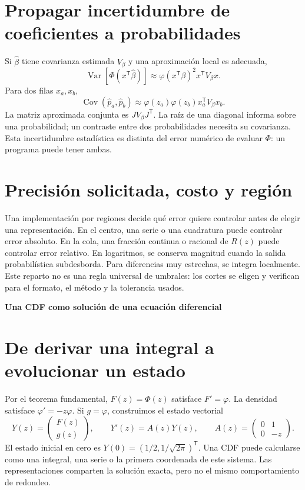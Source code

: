 \documentclass[11pt,a4paper]{article}
\newcommand{\T}{^{\mathsf T}}
\DeclareMathOperator{\Var}{Var}
\DeclareMathOperator{\Cov}{Cov}
\theoremstyle{definition}
\newcommand{\parte}[1]{\par\bigskip\Needspace{8\baselineskip}\begin{center}{\Large\bfseries\color{azul}#1}\end{center}}
\begin{document}
\section{Propagar incertidumbre de coeficientes a probabilidades}
Si $\widehat\beta$ tiene covarianza estimada $V_\beta$ y una aproximación local es adecuada,
\[
\Var[\Phi(x\T\widehat\beta)]
\approx\varphi(x\T\beta)^2x\T V_\beta x.
\]
Para dos filas $x_a,x_b$,
\[
\Cov(\widehat p_a,\widehat p_b)
\approx\varphi(z_a)\varphi(z_b)x_a\T V_\beta x_b.
\]
La matriz aproximada conjunta es $JV_\beta J\T$.
La raíz de una diagonal informa sobre una probabilidad; un contraste entre dos probabilidades necesita su covarianza.
Esta incertidumbre estadística es distinta del error numérico de evaluar $\Phi$: un programa puede tener ambas.

\section{Precisión solicitada, costo y región}
Una implementación por regiones decide qué error quiere controlar antes de elegir una representación.
En el centro, una serie o una cuadratura puede controlar error absoluto.
En la cola, una fracción continua o racional de $R(z)$ puede controlar error relativo.
En logaritmos, se conserva magnitud cuando la salida probabilística subdesborda.
Para diferencias muy estrechas, se integra localmente.
Este reparto no es una regla universal de umbrales: los cortes se eligen y verifican para el formato, el método y la tolerancia usados.



\parte{Una CDF como solución de una ecuación diferencial}
\section{De derivar una integral a evolucionar un estado}
Por el teorema fundamental,
$F(z)=\Phi(z)$ satisface $F'=\varphi$.
La densidad satisface $\varphi'=-z\varphi$.
Si $g=\varphi$, construimos el estado vectorial
\[
Y(z)=\begin{pmatrix}F(z)\\g(z)\end{pmatrix},\qquad
Y'(z)=A(z)Y(z),\qquad
A(z)=\begin{pmatrix}0&1\\0&-z\end{pmatrix}.
\]
El estado inicial en cero es
$Y(0)=(1/2,1/\sqrt{2\pi})\T$.
Una CDF puede calcularse como una integral, una serie o la primera coordenada de este sistema. Las representaciones comparten la solución exacta, pero no el mismo comportamiento de redondeo.
\end{document}
